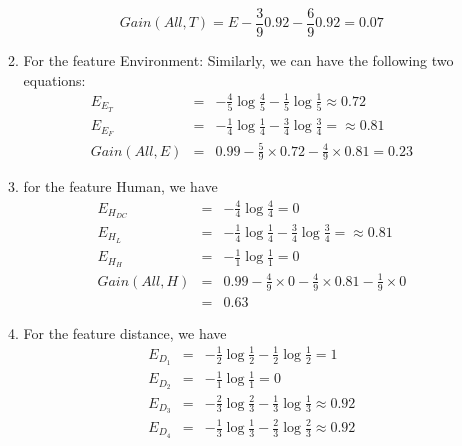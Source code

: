 \documentclass{article}[12pt]
\begin{document}
\begin{enumerate}
\begin{enumerate}
                    \begin{displaymath}
                        Gain(All, T) = E - \frac{3}{9} 0.92 - \frac{6}{9} 0.92 = 0.07
                    \end{displaymath}
                \item For the feature Environment:
                    Similarly, we can have the following two equations:
                    \begin{eqnarray}
                        E_{E_T} &= &-\frac{4}{5}\log{\frac{4}{5}} - \frac{1}{5}\log{\frac{1}{5}} \approx 0.72 \nonumber \\
                        E_{E_F} &= &-\frac{1}{4}\log{\frac{1}{4}} - \frac{3}{4}\log{\frac{3}{4}} = \approx 0.81 \nonumber \\
                        Gain(All, E)& =& 0.99 - \frac{5}{9} \times 0.72 - \frac{4}{9} \times 0.81= 0.23 \nonumber
                    \end{eqnarray}
                \item for the feature Human, we have
                    \begin{eqnarray}
                        E_{H_{DC}} &=& -\frac{4}{4}\log{\frac{4}{4}} = 0 \nonumber \\
                        E_{H_L} &=& -\frac{1}{4}\log{\frac{1}{4}} - \frac{3}{4}\log{\frac{3}{4}} = \approx 0.81 \nonumber \\
                        E_{H_H} &=& -\frac{1}{1}\log{\frac{1}{1}} = 0 \nonumber \\
                        Gain(All, H) &=& 0.99 - \frac{4}{9} \times 0 - \frac{4}{9}\times 0.81 - \frac{1}{9}\times 0 \nonumber \\ &=& 0.63 \nonumber
                    \end{eqnarray}
                \item For the feature distance, we have
                    \begin{eqnarray}
                        E_{D_1} &=&  -\frac{1}{2}\log{\frac{1}{2}} - \frac{1}{2}\log{\frac{1}{2}} = 1\nonumber \\
                        E_{D_2} &=& -\frac{1}{1} \log{\frac{1}{1}} = 0\nonumber \\
                        E_{D_3} &=& -\frac{2}{3}\log{\frac{2}{3}} - \frac{1}{3}\log{\frac{1}{3}} \approx 0.92\nonumber \\
                        E_{D_4} &=& -\frac{1}{3}\log{\frac{1}{3}} - \frac{2}{3}\log{\frac{2}{3}} \approx 0.92\nonumber \\

\end{eqnarray}
\end{enumerate}
\end{enumerate}
\end{document}

